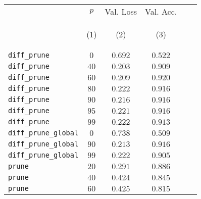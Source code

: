 \begin{table}[tbh]
        \caption{}
        \label{tab:}
        \centering
        \vspace{1em}
        \begin{tabular}{lccccc}
\toprule
{} &                         $p$ &                   Val. Loss &                   Val. Acc. \\
{} & \hypertarget{tabcol:1}{(1)} & \hypertarget{tabcol:2}{(2)} & \hypertarget{tabcol:3}{(3)} \\
\midrule
\texttt{diff\_prune}         &       $0$\textsuperscript{} &   $0.692$\textsuperscript{} &   $0.522$\textsuperscript{} \\
\texttt{diff\_prune}         &      $40$\textsuperscript{} &   $0.203$\textsuperscript{} &   $0.909$\textsuperscript{} \\
\texttt{diff\_prune}         &      $60$\textsuperscript{} &   $0.209$\textsuperscript{} &   $0.920$\textsuperscript{} \\
\texttt{diff\_prune}         &      $80$\textsuperscript{} &   $0.222$\textsuperscript{} &   $0.916$\textsuperscript{} \\
\texttt{diff\_prune}         &      $90$\textsuperscript{} &   $0.216$\textsuperscript{} &   $0.916$\textsuperscript{} \\
\texttt{diff\_prune}         &      $95$\textsuperscript{} &   $0.221$\textsuperscript{} &   $0.916$\textsuperscript{} \\
\texttt{diff\_prune}         &      $99$\textsuperscript{} &   $0.222$\textsuperscript{} &   $0.913$\textsuperscript{} \\
\texttt{diff\_prune\_global} &       $0$\textsuperscript{} &   $0.738$\textsuperscript{} &   $0.509$\textsuperscript{} \\
\texttt{diff\_prune\_global} &      $90$\textsuperscript{} &   $0.213$\textsuperscript{} &   $0.916$\textsuperscript{} \\
\texttt{diff\_prune\_global} &      $99$\textsuperscript{} &   $0.222$\textsuperscript{} &   $0.905$\textsuperscript{} \\
\texttt{prune}               &      $20$\textsuperscript{} &   $0.291$\textsuperscript{} &   $0.886$\textsuperscript{} \\
\texttt{prune}               &      $40$\textsuperscript{} &   $0.424$\textsuperscript{} &   $0.845$\textsuperscript{} \\
\texttt{prune}               &      $60$\textsuperscript{} &   $0.425$\textsuperscript{} &   $0.815$\textsuperscript{} \\

\end{tabular}
\end{table}
